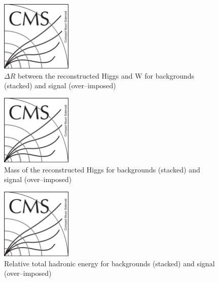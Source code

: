 \begin{figure}[!Hhtbp]
  \begin{center}
    \includegraphics[width=0.3\textwidth]{figs/CMSlogo.png}
    \caption{$\Delta R$ between the reconstructed Higgs and W for backgrounds (stacked) and signal (over--imposed)}
    \label{fig:Var3}
  \end{center}
\end{figure}

\begin{figure}[!Hhtbp]
  \begin{center}
    \includegraphics[width=0.3\textwidth]{figs/CMSlogo.png}
    \caption{Mass of the reconstructed Higgs for backgrounds (stacked) and signal (over--imposed)}
    \label{fig:Var4}
  \end{center}
\end{figure}

\begin{figure}[!Hhtbp]
  \begin{center}
    \includegraphics[width=0.3\textwidth]{figs/CMSlogo.png}
    \caption{Relative total hadronic energy for backgrounds (stacked) and signal (over--imposed)}
    \label{fig:Var5}
  \end{center}
\end{figure}

